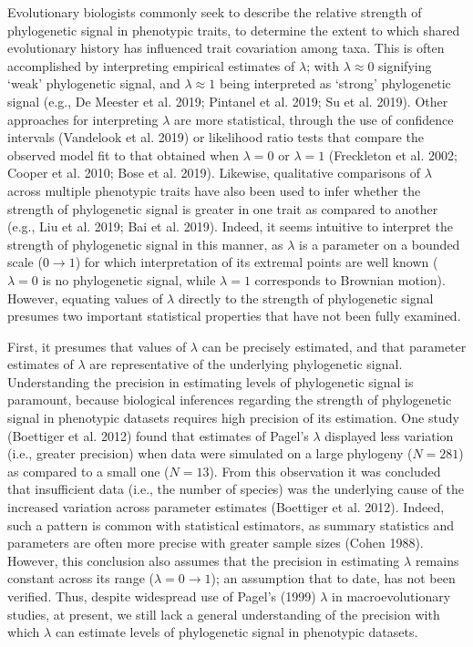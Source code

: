 \documentclass[
]{article}
\begin{document}
Evolutionary biologists commonly seek to describe the relative strength
of phylogenetic signal in phenotypic traits, to determine the extent to
which shared evolutionary history has influenced trait covariation among
taxa. This is often accomplished by interpreting empirical estimates of
\(\lambda\); with \(\lambda\approx0\) signifying `weak' phylogenetic
signal, and \(\lambda\approx1\) being interpreted as `strong'
phylogenetic signal (e.g., De Meester et al. 2019; Pintanel et al. 2019;
Su et al. 2019). Other approaches for interpreting \(\lambda\) are more
statistical, through the use of confidence intervals (Vandelook et al.
2019) or likelihood ratio tests that compare the observed model fit to
that obtained when \(\lambda=0\) or \(\lambda=1\) (Freckleton et al.
2002; Cooper et al. 2010; Bose et al. 2019). Likewise, qualitative
comparisons of \(\lambda\) across multiple phenotypic traits have also
been used to infer whether the strength of phylogenetic signal is
greater in one trait as compared to another (e.g., Liu et al. 2019; Bai
et al. 2019). Indeed, it seems intuitive to interpret the strength of
phylogenetic signal in this manner, as \(\lambda\) is a parameter on a
bounded scale (\(0\to1\)) for which interpretation of its extremal
points are well known (\(\lambda=0\) is no phylogenetic signal, while
\(\lambda=1\) corresponds to Brownian motion). However, equating values
of \(\lambda\) directly to the strength of phylogenetic signal presumes
two important statistical properties that have not been fully examined.
\hfill\break

First, it presumes that values of \(\lambda\) can be precisely
estimated, and that parameter estimates of \(\lambda\) are
representative of the underlying phylogenetic signal. Understanding the
precision in estimating levels of phylogenetic signal is paramount,
because biological inferences regarding the strength of phylogenetic
signal in phenotypic datasets requires high precision of its estimation.
One study (Boettiger et al. 2012) found that estimates of Pagel's
\(\lambda\) displayed less variation (i.e., greater precision) when data
were simulated on a large phylogeny (\(N=281\)) as compared to a small
one (\(N=13\)). From this observation it was concluded that insufficient
data (i.e., the number of species) was the underlying cause of the
increased variation across parameter estimates (Boettiger et al. 2012).
Indeed, such a pattern is common with statistical estimators, as summary
statistics and parameters are often more precise with greater sample
sizes (Cohen 1988). However, this conclusion also assumes that the
precision in estimating \(\lambda\) remains constant across its range
(\(\lambda = 0 \to 1\)); an assumption that to date, has not been
verified. Thus, despite widespread use of Pagel's (1999) \(\lambda\) in
macroevolutionary studies, at present, we still lack a general
understanding of the precision with which \(\lambda\) can estimate
levels of phylogenetic signal in phenotypic datasets. \hfill\break
\end{document}
